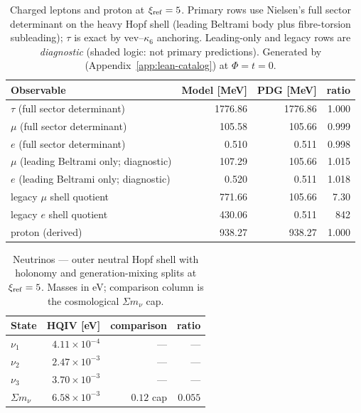 \documentclass[11pt]{amsart}
\newcommand{\diagnosticrow}{\rowcolor{black!6}}
\begin{document}
\begin{table}[ht]
  \centering
  \caption{Charged leptons and proton at $\xi_{\rm ref}=5$. Primary rows use Nielsen's
    full sector determinant on the heavy Hopf shell (leading Beltrami body plus
    fibre-torsion subleading); $\tau$ is exact by vev--$\kappa_6$ anchoring.
    Leading-only and legacy rows are \emph{diagnostic} (shaded logic: not primary predictions).
    Generated by \protect{} (Appendix~\ref{app:lean-catalog}) at $\Phi=t=0$.}
  \label{tab:pdg-lockin}
  \begin{tabular}{lrrr}
    \toprule
    Observable & Model [MeV] & PDG [MeV] & ratio \\
    \midrule
    $\tau$ (full sector determinant) & 1776.86 & 1776.86 & 1.000 \\
    $\mu$ (full sector determinant) & 105.58 & 105.66 & 0.999 \\
    $e$ (full sector determinant) & 0.510 & 0.511 & 0.998 \\
    \diagnosticrow
    $\mu$ (leading Beltrami only; diagnostic) & 107.29 & 105.66 & 1.015 \\
    \diagnosticrow
    $e$ (leading Beltrami only; diagnostic) & 0.520 & 0.511 & 1.018 \\
    \diagnosticrow
    legacy $\mu$ shell quotient & 771.66 & 105.66 & 7.30 \\
    \diagnosticrow
    legacy $e$ shell quotient & 430.06 & 0.511 & 842 \\
    proton (derived) & 938.27 & 938.27 & 1.000 \\
    \bottomrule
  \end{tabular}
\end{table}

\begin{table}[ht]
  \centering
  \caption{Neutrinos --- outer neutral Hopf shell with holonomy and generation-mixing splits at $\xi_{\rm ref}=5$.
    Masses in eV; comparison column is the cosmological $\Sigma m_\nu$ cap.}
  \label{tab:neutrino-global}
  \begin{tabular}{lrrr}
    \toprule
    State & HQIV [eV] & comparison & ratio \\
    \midrule
    $\nu_1$ & $4.11\times 10^{-4}$ & --- & --- \\
    $\nu_2$ & $2.47\times 10^{-3}$ & --- & --- \\
    $\nu_3$ & $3.70\times 10^{-3}$ & --- & --- \\
    $\Sigma m_\nu$ & $6.58\times 10^{-3}$ & $0.12$ cap & $0.055$ \\
    \bottomrule
  \end{tabular}
\end{table}
\end{document}
